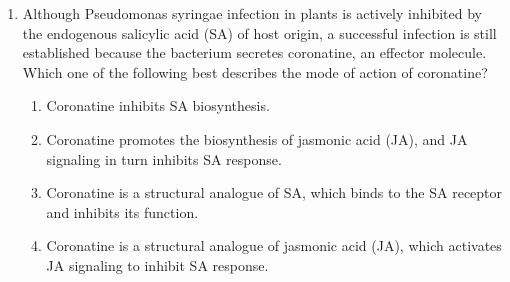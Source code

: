 \documentclass[journal,12pt,onecolumn]{IEEEtran}
\begin{document}
\begin{enumerate}
    \item Although Pseudomonas syringae infection in plants is actively inhibited by the endogenous salicylic acid (SA) of host origin, a successful infection is still established because the bacterium secretes coronatine, an effector molecule. Which one of the following best describes the mode of action of coronatine?
    \begin{enumerate}
        \item Coronatine inhibits SA biosynthesis.
        \item Coronatine promotes the biosynthesis of jasmonic acid (JA), and JA signaling in turn inhibits SA response.
        \item Coronatine is a structural analogue of SA, which binds to the SA receptor and inhibits its function.
        \item Coronatine is a structural analogue of jasmonic acid (JA), which activates JA signaling to inhibit SA response.
    \end{enumerate}


\end{enumerate}
\end{document}
